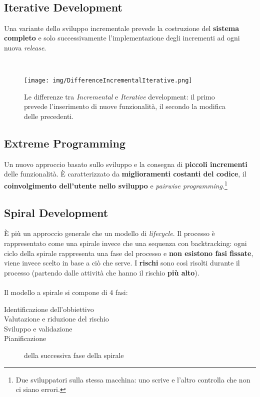 \ \\
\subsection{Iterative Development}
Una variante dello sviluppo incrementale prevede la costruzione del
\textbf{sistema completo} e solo successivamente l'implementazione
degli incrementi ad ogni nuova \textit{release}.

\ \\
\begin{figure}[H]
    \centering
    \texttt{[image: img/DifferenceIncrementalIterative.png]}
    \caption*{Le differenze tra \textit{Incremental} e \textit{Iterative}
            development: il primo prevede l'inserimento di nuove funzionalit\`a,
            il secondo la modifica delle precedenti.}
\end{figure}

\subsection{Extreme Programming}
Un nuovo approccio basato sullo sviluppo e la consegna di
\textbf{piccoli incrementi} delle funzionalit\`a. \`E caratterizzato da
\textbf{miglioramenti costanti del codice}, il \textbf{coinvolgimento
dell'utente nello sviluppo} e \textit{pairwise programming}.\footnote{
Due sviluppatori sulla stessa macchina: uno scrive e l'altro controlla
che non ci siano errori.}

\subsection{Spiral Development}
\`E pi\`u un approccio generale che un modello di \textit{lifecycle}.
Il processo \`e rappresentato come una spirale invece che una
sequenza con backtracking: ogni ciclo della spirale rappresenta una
fase del processo e \textbf{non esistono fasi fissate}, viene invece
scelto in base a ci\`o che serve. I \textbf{rischi} sono cos\`i risolti
durante il processo (partendo dalle attivit\`a che hanno il rischio
\textbf{pi\`u alto}).\\~\\

Il modello a spirale si compone di 4 fasi:
\begin{description}
    \item[Identificazione dell'obbiettivo]
    \item[Valutazione e riduzione del rischio]
    \item[Sviluppo e validazione]
    \item[Pianificazione] della successiva fase della spirale
\end{description}

